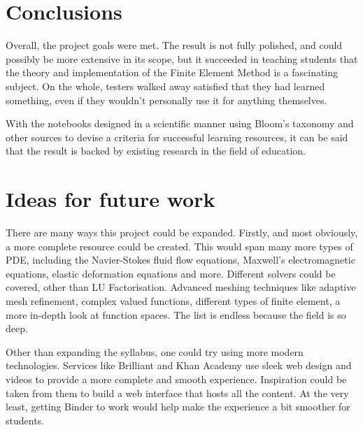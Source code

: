 \section{Conclusions}

Overall, the project goals were met. The result is not fully polished, and could possibly be more extensive in its scope, but it succeeded in teaching students that the theory and implementation of the Finite Element Method is a fascinating subject. On the whole, testers walked away satisfied that they had learned something, even if they wouldn't personally use it for anything themselves.

With the notebooks designed in a scientific manner using Bloom's taxonomy and other sources to devise a criteria for successful learning resources, it can be said that the result is backed by existing research in the field of education.

\section{Ideas for future work} \label{section:ideas-for-future-work}

There are many ways this project could be expanded. Firstly, and most obviously, a more complete resource could be created. This would span many more types of PDE, including the Navier-Stokes fluid flow equations, Maxwell's electromagnetic equations, elastic deformation equations and more. Different solvers could be covered, other than LU Factorisation. Advanced meshing techniques like adaptive mesh refinement, complex valued functions, different types of finite element, a more in-depth look at function spaces. The list is endless because the field is so deep.

Other than expanding the syllabus, one could try using more modern technologies. Services like Brilliant and Khan Academy use sleek web design and videos to provide a more complete and smooth experience. Inspiration could be taken from them to build a web interface that hosts all the content. At the very least, getting Binder to work would help make the experience a bit smoother for students.